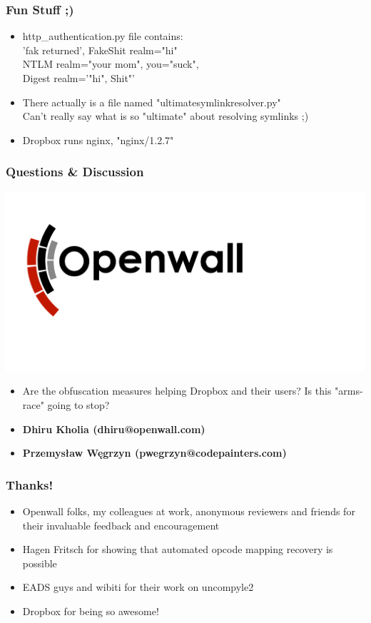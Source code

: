 \documentclass{beamer}
\begin{document}
\begin{frame}
\frametitle{Fun Stuff ;)}
\begin{itemize}
\itemsep 1em
\item http\_authentication.py file contains: \\
  \vspace{1em} 'fak returned', FakeShit realm="hi" \\
  \vspace{1em} NTLM realm="your mom", you="suck", \\
  \vspace{1em} Digest realm='"hi", Shit"' \\
\item There actually is a file named "ultimatesymlinkresolver.py" \\
  \vspace{1em} Can't really say what is so "ultimate" about resolving symlinks ;)
\item Dropbox runs nginx, "nginx/1.2.7"
\end{itemize}
\end{frame}

\begin{frame}
\frametitle{Questions \& Discussion}
\includegraphics[scale=0.16]{openwall-logo.png}
\begin{itemize}
\itemsep 2em
\item Are the obfuscation measures helping Dropbox and their users? Is this "arms-race" going to stop?
\item \bf{Dhiru Kholia (dhiru@openwall.com)}
\item \bf{Przemysław Węgrzyn (pwegrzyn@codepainters.com)}
\end{itemize}
\end{frame}

\begin{frame}
\frametitle{Thanks!}
\begin{itemize}
\itemsep 2.3em
\item Openwall folks, my colleagues at work, anonymous reviewers and friends
for their invaluable feedback and encouragement
\item Hagen Fritsch for showing that automated opcode mapping recovery is
possible
\item EADS guys and wibiti for their work on uncompyle2

\item Dropbox for being so awesome!
\end{itemize}
\end{frame}
\end{document}
